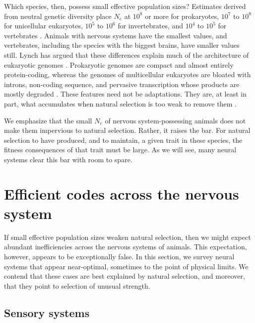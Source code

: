 \documentclass[twocolumn]{article}
\begin{document}
Which species, then, possess small effective population sizes? Estimates derived from neutral genetic diversity place $N_e$ at $10^8$ or more for prokaryotes, $10^7$ to $10^8$ for unicellular eukaryotes, $10^5$ to $10^6$ for invertebrates, and $10^4$ to $10^5$ for vertebrates \cite{Lynch_Conery_2003}. Animals with nervous systems have the smallest values, and vertebrates, including the species with the biggest brains, have smaller values still. Lynch has argued that these differences explain much of the architecture of eukaryotic genomes \cite{Lynch_2007, lynch2007origins}. Prokaryotic genomes are compact and almost entirely protein-coding, whereas the genomes of multicellular eukaryotes are bloated with introns, non-coding sequence, and pervasive transcription whose products are mostly degraded \cite{milo2016cell, menet_rosbash_2012, mcnicoll_neugebauer_2014}. These features need not be adaptations. They are, at least in part, what accumulates when natural selection is too weak to remove them \cite{Lynch_2007}.

We emphasize that the small $N_e$ of nervous system-possessing animals does not make them impervious to natural selection. Rather, it raises the bar. For natural selection to have produced, and to maintain, a given trait in these species, the fitness consequences of that trait must be large. As we will see, many neural systems clear this bar with room to spare.

\section{Efficient codes across the nervous system} \label{sec_efficient}

If small effective population sizes weaken natural selection, then we might expect abundant inefficiencies across the nervous systems of animals. This expectation, however, appears to be exceptionally false. In this section, we survey neural systems that appear near-optimal, sometimes to the point of physical limits. We contend that these cases are best explained by natural selection, and moreover, that they point to selection of unusual strength.

\subsection{Sensory systems}
\end{document}
